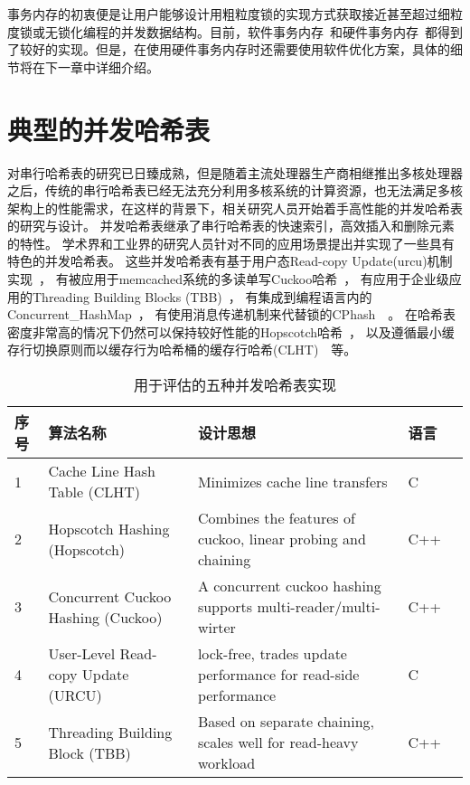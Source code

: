 事务内存的初衷便是让用户能够设计用粗粒度锁的实现方式获取接近甚至超过细粒度锁或无锁化编程的并发数据结构。目前，软件事务内存~\cite{shavit1997software,saha2006mcrt,spear2010lightweight}和硬件事务内存~\cite{yen2007logtm,tsx,ware2010architecting}都得到了较好的实现。但是，在使用硬件事务内存时还需要使用软件优化方案，具体的细节将在下一章中详细介绍。


\section{典型的并发哈希表}

对串行哈希表的研究已日臻成熟，但是随着主流处理器生产商相继推出多核处理器之后，传统的串行哈希表已经无法充分利用多核系统的计算资源，也无法满足多核架构上的性能需求，在这样的背景下，相关研究人员开始着手高性能的并发哈希表的研究与设计。
并发哈希表继承了串行哈希表的快速索引，高效插入和删除元素的特性。
学术界和工业界的研究人员针对不同的应用场景提出并实现了一些具有特色的并发哈希表。
这些并发哈希表有基于用户态Read-copy Update(urcu)机制实现~\cite{urcu}，
有被应用于memcached系统的多读单写Cuckoo哈希~\cite{memc3}，
有应用于企业级应用的Threading Building Blocks (TBB)~\cite{tbb}，
有集成到编程语言内的Concurrent\_HashMap~\cite{oracle}，
有使用消息传递机制来代替锁的CPhash~\cite{metreveli2012cphash}~。
在哈希表密度非常高的情况下仍然可以保持较好性能的Hopscotch哈希~\cite{hopscotch}，
以及遵循最小缓存行切换原则而以缓存行为哈希桶的缓存行哈希(CLHT)~\cite{clht}~等。

\begin{table}[htbp]
  \caption{用于评估的五种并发哈希表实现}
\label{tab:concurrent_hash}
\footnotesize
\centering
\begin{tabular}{lllll}
\toprule
序号 &   算法名称   &   设计思想     &   语言\\
\midrule
1  &  Cache Line Hash Table (CLHT)   &  Minimizes cache line transfers \cite{clht} &   C\\

2  &  Hopscotch Hashing (Hopscotch)   &  Combines the features of cuckoo, linear probing and chaining \cite{hopscotch}     &   C++ \\

3  &   Concurrent Cuckoo Hashing (Cuckoo)   &  A concurrent cuckoo hashing supports multi-reader/multi-wirter \cite{cuckoo}  &   C++ \\

4  &   User-Level Read-copy Update (URCU)   &   lock-free, trades update performance for read-side performance \cite{urcu}   &   C \\

5  &   Threading Building Block (TBB)   &   Based on separate chaining, scales well for read-heavy workload \cite{tbb}        &   C++ \\
\bottomrule
\end{tabular}
\end{table}

